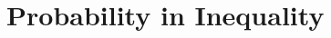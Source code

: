\documentclass[inequalities.tex]{subfile}
\begin{document}
	\section{Probability in Inequality}\label{sec:prob}
	
\end{document}
